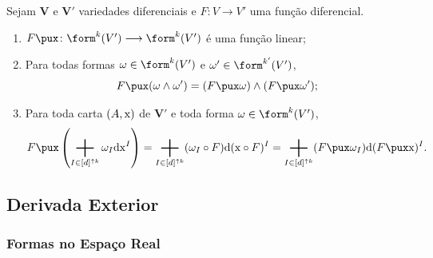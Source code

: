 \begin{prop}
Sejam $\bm V$ e $\bm V'$ variedades diferenciais e $F\colon V \to V'$ uma função diferencial.
	\begin{enumerate}
	\item $F\pux\colon \form^k (V') \to \form^k(V')$ é uma função linear;
	\item Para todas formas $\omega \in \form^k(V')$ e $\omega' \in \form^{k'} (V')$,
		\begin{equation*}
		F\pux(\omega \wedge \omega') = (F\pux\omega) \wedge (F\pux\omega');
		\end{equation*}
	\item Para toda carta $(A,\mathrm{x})$ de $\bm V'$ e toda forma $\omega \in \form^k (V')$,
		\begin{equation*}
		F\pux \left( \sum_{I \in [d]^{\uparrow k}} \omega_I \dd\x^{I}\right) = \sum_{I \in [d]^{\uparrow k}} (\omega_I \circ F) \dd(\x \circ F)^{I} = \sum_{I \in [d]^{\uparrow k}} (F\pux\omega_I) \dd(F\pux\x)^{I}.
		\end{equation*}
	\end{enumerate}
\end{prop}

\subsection{Derivada Exterior}

\subsubsection{Formas no Espaço Real}

